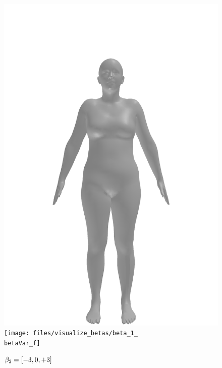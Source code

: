 \begin{figure}[ht!]
\begin{minipage}[b]{\textwidth}
        \includegraphics[width=\imgWidth]{files/visualize_betas/baseline_f}
        \texttt{[image: files/visualize\_betas/beta\_1\_\\betaVar\_f]}
        \caption[Effect of varying $\beta_2$ in SMPL]{$\beta_2 = [-3, 0, +3]$}
    \end{minipage}
\end{figure}

